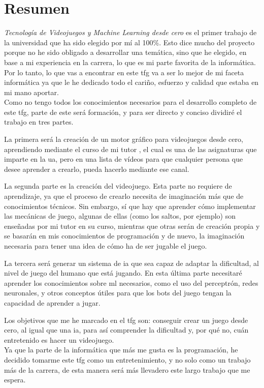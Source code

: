 \chapter*{Resumen}
\textit{Tecnología de Videojuegos y Machine Learning desde cero} es el primer trabajo de la universidad que ha sido  elegido por mí al 100\%. Esto dice mucho del proyecto porque no he sido obligado a desarrollar una temática, sino que he elegido, en base a mi experiencia en la carrera, lo que es mi parte favorita de la informática. Por lo tanto, lo que vas a encontrar en este \gls{tfg} va a ser lo mejor de mi faceta informática ya que le he dedicado todo el cariño, esfuerzo y calidad que estaba en mi mano aportar.
\\
Como no tengo todos los conocimientos necesarios para el desarrollo completo de este \gls{tfg}, parte de este será formación, y para ser directo y conciso dividiré el trabajo en tres partes.

La primera será la creación de un motor gráfico para videojuegos desde cero, aprendiendo mediante el curso de mi tutor \cite{CursoMotorC++}, el cual es una de las asignaturas que imparte en la \gls{ua}, pero en una lista de vídeos para que cualquier persona que desee aprender a crearlo, pueda hacerlo mediante ese canal.

La segunda parte es la creación del videojuego. Esta parte no requiere de aprendizaje, ya que el proceso de crearlo necesita de imaginación más que de conocimientos técnicos. Sin embargo, sí que hay que aprender cómo implementar las mecánicas de juego, algunas de ellas (como los saltos, por ejemplo) son enseñadas por mi tutor en su curso, mientras que otras serán de creación propia y se basarán en mis conocimientos de programación y de nuevo, la imaginación necesaria para tener una idea de cómo ha de ser jugable el juego.

La tercera será generar un sistema de \gls{ia} que sea capaz de adaptar la dificultad, al nivel de juego del humano que está jugando. En esta última parte necesitaré aprender los conocimientos sobre \gls{ml} necesarios, como el uso del perceptrón, redes neuronales, y otros conceptos útiles para que los bots del juego tengan la capacidad de aprender  a jugar.

Los objetivos que me he marcado en el \gls{tfg} son: conseguir crear un juego desde cero, al igual que una \gls{ia}, para así comprender la dificultad y, por qué no, cuán entretenido es hacer un videojuego. 
\\
Ya que la parte de la informática que más me gusta es la programación, he decidido tomarme este \gls{tfg} como un entretenimiento, y no solo como un trabajo más de la carrera, de esta manera será más llevadero este largo trabajo que me espera.

